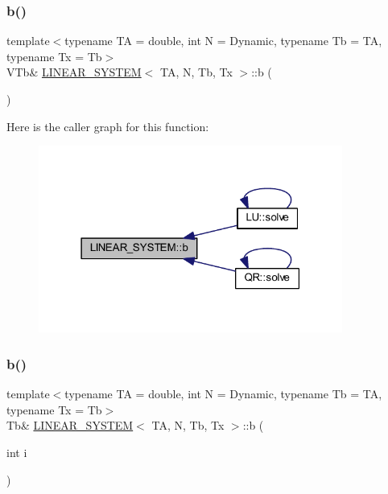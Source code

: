 \mbox{\label{class_l_i_n_e_a_r___s_y_s_t_e_m_a6754b4aaf5db40c45522d289e969f917}} 
\subsubsection{\texorpdfstring{b()}{b()}\hspace{0.1cm}{\footnotesize\ttfamily [1/2]}}
{\footnotesize\ttfamily template$<$typename TA = double, int N = Dynamic, typename Tb = TA, typename Tx = Tb$>$ \\
V\+Tb\& \mbox{\hyperlink{class_l_i_n_e_a_r___s_y_s_t_e_m}{L\+I\+N\+E\+A\+R\+\_\+\+S\+Y\+S\+T\+EM}}$<$ TA, N, Tb, Tx $>$\+::b (\begin{DoxyParamCaption}{ }\end{DoxyParamCaption})\hspace{0.3cm}{\ttfamily [inline]}}

Here is the caller graph for this function\+:\nopagebreak
\begin{figure}[H]
\begin{center}
\leavevmode
\includegraphics[width=283pt]{class_l_i_n_e_a_r___s_y_s_t_e_m_a6754b4aaf5db40c45522d289e969f917_icgraph}
\end{center}
\end{figure}
\mbox{\label{class_l_i_n_e_a_r___s_y_s_t_e_m_ae7c2a505d8cd0c6eb4b49bc0ece4e233}} 
\subsubsection{\texorpdfstring{b()}{b()}\hspace{0.1cm}{\footnotesize\ttfamily [2/2]}}
{\footnotesize\ttfamily template$<$typename TA = double, int N = Dynamic, typename Tb = TA, typename Tx = Tb$>$ \\
Tb\& \mbox{\hyperlink{class_l_i_n_e_a_r___s_y_s_t_e_m}{L\+I\+N\+E\+A\+R\+\_\+\+S\+Y\+S\+T\+EM}}$<$ TA, N, Tb, Tx $>$\+::b (\begin{DoxyParamCaption}\item[{int}]{i }\end{DoxyParamCaption})\hspace{0.3cm}{\ttfamily [inline]}}

